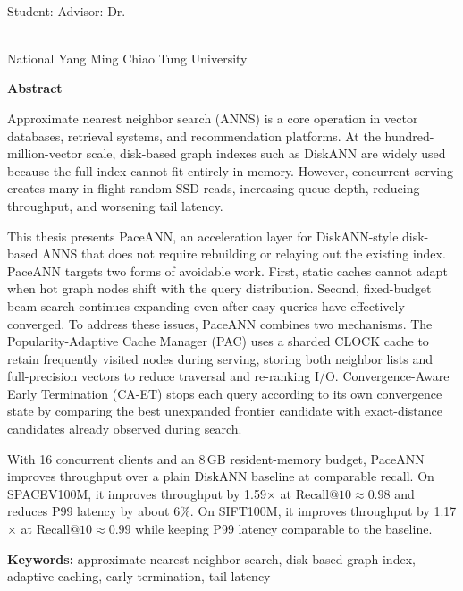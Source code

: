 \begin{center}
    \large

    \begin{singlespace}
        \textbf{\englishTitle{}} \\[0.5cm]
    \end{singlespace}

    \begin{singlespace}
        Student: \studentEnName\hspace{1.0cm}
        Advisor: Dr.\,\advisorEnName \\
    \end{singlespace}

    \vspace{0.5cm}
    \begin{singlespace}
        \NameofDepartmentInstituteEN\\
        National Yang Ming Chiao Tung University\\[0.2cm]
    \end{singlespace}

    \textbf{Abstract} \\[0.5cm]
\end{center}

\normalsize

Approximate nearest neighbor search (ANNS) is a core operation in vector databases, retrieval systems, and recommendation platforms.
At the hundred-million-vector scale, disk-based graph indexes such as DiskANN are widely used because the full index cannot fit entirely in memory.
However, concurrent serving creates many in-flight random SSD reads, increasing queue depth, reducing throughput, and worsening tail latency.

This thesis presents PaceANN, an acceleration layer for DiskANN-style disk-based ANNS that does not require rebuilding or relaying out the existing index.
PaceANN targets two forms of avoidable work.
First, static caches cannot adapt when hot graph nodes shift with the query distribution.
Second, fixed-budget beam search continues expanding even after easy queries have effectively converged.
To address these issues, PaceANN combines two mechanisms.
The Popularity-Adaptive Cache Manager (PAC) uses a sharded CLOCK cache to retain frequently visited nodes during serving, storing both neighbor lists and full-precision vectors to reduce traversal and re-ranking I/O.
Convergence-Aware Early Termination (CA-ET) stops each query according to its own convergence state by comparing the best unexpanded frontier candidate with exact-distance candidates already observed during search.

With 16 concurrent clients and an 8\,GB resident-memory budget, PaceANN improves throughput over a plain DiskANN baseline at comparable recall.
On SPACEV100M, it improves throughput by 1.59$\times$ at $\text{Recall@10}\approx0.98$ and reduces P99 latency by about 6\%.
On SIFT100M, it improves throughput by 1.17$\times$ at $\text{Recall@10}\approx0.99$ while keeping P99 latency comparable to the baseline.

\vspace{1cm}

\textbf{Keywords:} approximate nearest neighbor search, disk-based graph index, adaptive caching, early termination, tail latency

